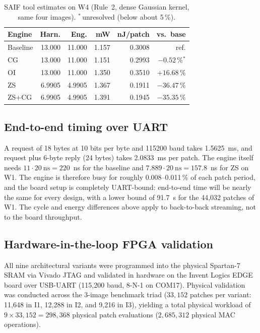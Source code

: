 \documentclass[11pt,journal,draftclsnofoot,onecolumn]{IEEEtran}
\begin{document}
\begin{table}[t]
\centering
\caption{SAIF tool estimates on W4 (Rule~2, dense Gaussian kernel, same four images). $^{\ast}$\,unresolved (below about 5\,\%).}
\label{tab:energy2}
\small
\setlength{\tabcolsep}{8pt}
\begin{tabular}{lrrrrr}
\toprule
\textbf{Engine} & \textbf{Harn.} & \textbf{Eng.} & \textbf{mW} & \textbf{nJ/patch} & \textbf{vs.\ base}\\
\midrule
Baseline & 13.000 & 11.000 & 1.157 & 0.3008 & ref.\\
CG       & 13.000 & 11.000 & 1.151 & 0.2993 & $-0.52\,\%$$^{\ast}$\\
OI       & 13.000 & 11.000 & 1.350 & 0.3510 & $+16.68\,\%$\\
ZS       &  6.9905 &  4.9905 & 1.367 & 0.1911 & $-36.47\,\%$\\
ZS+CG    &  6.9905 &  4.9905 & 1.391 & 0.1945 & $-35.35\,\%$\\
\bottomrule
\end{tabular}
\end{table}

\subsection{End-to-end timing over UART}
A request of 18 bytes at 10 bits per byte and 115200 baud takes 1.5625~ms, and request plus
6-byte reply (24 bytes) takes 2.0833~ms per patch. The engine itself needs
$11\cdot20~\mathrm{ns}=220$~ns for the baseline and $7.889\cdot20~\mathrm{ns}=157.8$~ns for ZS on
W1. The engine is therefore busy for roughly 0.008--0.011\,\% of each patch period, and the
board setup is completely UART-bound: end-to-end time will be nearly the same for every
design, with a lower bound of 91.7~s for the 44{,}032 patches of W1. The cycle and energy
differences above apply to back-to-back streaming, not to the board throughput.

\subsection{Hardware-in-the-loop FPGA validation}\label{sec:r-board}
All nine architectural variants were programmed into the physical Spartan-7 SRAM via
Vivado JTAG and validated in hardware on the Invent Logics EDGE board over USB-UART
(115{,}200 baud, 8-N-1 on COM17). Physical validation was conducted across the 3-image
benchmark triad ($33{,}152$ patches per variant: 11{,}648 in I1, 12{,}288 in I2, and
9{,}216 in I3), yielding a total physical workload of $9 \times 33{,}152 = 298{,}368$
physical patch evaluations ($2{,}685{,}312$ physical MAC operations).
\end{document}
